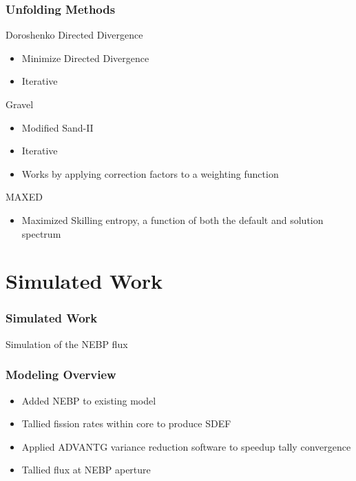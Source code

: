 \documentclass[fleqn]{beamer}
\begin{document}
\begin{frame}
\frametitle{Unfolding Methods}

Doroshenko Directed Divergence
\begin{itemize}
\item Minimize Directed Divergence
\item Iterative
\end{itemize}

Gravel
\begin{itemize}
\item Modified Sand-II
\item Iterative
\item Works by applying correction factors to a weighting function
\end{itemize}

MAXED
\begin{itemize}
\item Maximized Skilling entropy, a function of both the default and solution spectrum
\end{itemize}


\end{frame}


\section{Simulated Work}

\begin{frame}
\frametitle{Simulated Work}

Simulation of the NEBP flux

\end{frame}


\begin{frame}
\frametitle{Modeling Overview}

\begin{itemize}
\item Added NEBP to existing model
\item Tallied fission rates within core to produce SDEF
\item Applied ADVANTG variance reduction software to speedup tally convergence
\item Tallied flux at NEBP aperture
\end{itemize}

\end{frame}
\end{document}
